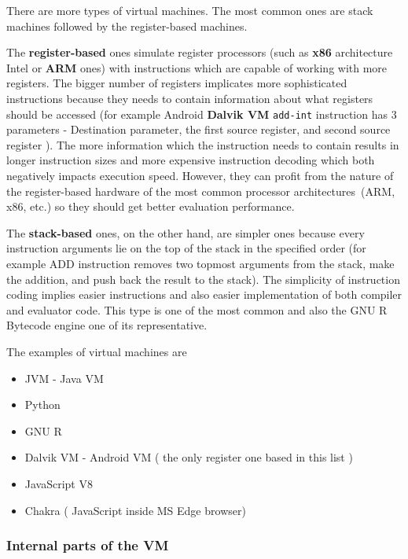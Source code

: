 \documentclass[thesis=M,english]{FITthesis}[2018/10/20]
\newcommand{\code}[1]{\texttt{#1}}
\begin{document}
There are more types of virtual machines. The most common ones are stack machines followed by the register-based machines.

The \textbf{register-based} ones simulate register processors (such as \textbf{x86} architecture Intel or \textbf{ARM} ones) with instructions which are capable of working with more registers. The bigger number of registers implicates more sophisticated instructions because they needs to contain information about what registers should be accessed (for example Android \textbf{Dalvik VM} \code{add-int} instruction has 3 parameters - Destination parameter, the first source register, and second source register ). The more information which the instruction needs to contain results in longer instruction sizes and more expensive instruction decoding which both negatively impacts execution speed. However, they can profit from the nature of the register-based hardware of the most common processor architectures~(ARM, x86, etc.) so they should get better evaluation performance.

The \textbf{stack-based} ones, on the other hand, are simpler ones because every instruction arguments lie on the top of the stack in the specified order (for example ADD instruction removes two topmost arguments from the stack, make the addition, and push back the result to the stack). The simplicity of instruction coding implies easier instructions and also easier implementation of both compiler and evaluator code. This type is one of the most common and also the GNU R Bytecode engine one of its representative.

The examples of virtual machines are
\begin{itemize}
	\item JVM - Java VM
	\item Python
	\item GNU R
	\item Dalvik VM - Android VM ( the only register one based in this list )
	\item JavaScript V8
	\item Chakra ( JavaScript inside MS Edge browser)
\end{itemize}

\subsubsection{Internal parts of the VM}\label{internal-parts-of-vm}
\end{document}
